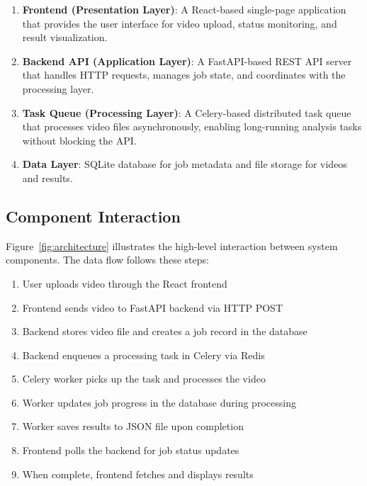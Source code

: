 \begin{enumerate}
    \item \textbf{Frontend (Presentation Layer)}: A React-based single-page application that provides the user interface for video upload, status monitoring, and result visualization.

    \item \textbf{Backend API (Application Layer)}: A FastAPI-based REST API server that handles HTTP requests, manages job state, and coordinates with the processing layer.

    \item \textbf{Task Queue (Processing Layer)}: A Celery-based distributed task queue that processes video files asynchronously, enabling long-running analysis tasks without blocking the API.

    \item \textbf{Data Layer}: SQLite database for job metadata and file storage for videos and results.
\end{enumerate}

\subsection{Component Interaction}

Figure~\ref{fig:architecture} illustrates the high-level interaction between system components. The data flow follows these steps:

\begin{enumerate}
    \item User uploads video through the React frontend
    \item Frontend sends video to FastAPI backend via HTTP POST
    \item Backend stores video file and creates a job record in the database
    \item Backend enqueues a processing task in Celery via Redis
    \item Celery worker picks up the task and processes the video
    \item Worker updates job progress in the database during processing
    \item Worker saves results to JSON file upon completion
    \item Frontend polls the backend for job status updates
    \item When complete, frontend fetches and displays results
\end{enumerate}

